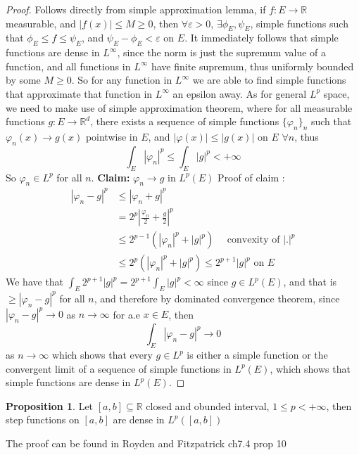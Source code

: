 \documentclass[13pt]{article}
\theoremstyle{definition} --- default
\newtheorem{proposition}[theorem]{Proposition}
\theoremstyle{definition}
\theoremstyle{remark}
\begin{document}
	\begin{proof}
		Follows directly from simple approximation lemma, if $f \colon E \to \mathbb{R}$ measurable, and $|f(x)| \leq M \geq 0$, then $\forall \varepsilon >0$, $\exists \phi_E, \psi_E$, simple functions such that $\phi_E \leq f \leq \psi_E$, and $\psi_E - \phi_E < \varepsilon$ on $E$. It immediately follows that simple functions are dense in $L^\infty$, since the norm is just the supremum value of a function, and all functions in $L^\infty$ have finite supremum, thus uniformly bounded by some $M \geq 0$. So for any function in $L^\infty$ we are able to find simple functions that approximate that function in $L^\infty$ an epsilon away. As for general $L^p$ space, we need to make use of simple approximation theorem, where for all measurable functions $g \colon E \to \mathbb{R}^d$, there exists a sequence of simple functions $\{\varphi_n\}_n$ such that $\varphi_n(x) \to g(x)$ pointwise in $E$, and $|\varphi(x)| \leq |g(x)|$ on $E$ $\forall n$, thus 
		$$ \int_{E} |\varphi_n|^p \leq \int_{E} |g|^p < +\infty$$
		So $\varphi_n \in L^p $ for all $n$. \textbf{Claim: } $\varphi_n \to g$ in $L^p (E)$
		Proof of claim : 
		\begin{align*}
			|\varphi_n - g|^p &\leq |\varphi_n + g|^p \\
					  &= 2^p |\frac{\varphi_n}{2} + \frac{g}{2}|^p \\
					  &\leq 2^{p-1} (|\varphi_n|^p + |g|^p )\quad \text{ convexity of $|.|^p$}\\
					  &\leq 2^p (|\varphi_n|^p  + |g|^p )\leq 2^{p+1}|g|^p \text{ on $E$}
		\end{align*}
		We have that $\int_{E} 2^{p+1}|g|^p  = 2^{p+1} \int_{E}|g|^p < \infty$ since $g \in L^p(E)$, and that is $\geq |\varphi_n -  g|^p $ for all $n$, and therefore by dominated convergence theorem, since $|\varphi_n - g|^p \to 0$ as $n \to \infty$ for a.e $x \in E$, then
		$$\int_{E} |\varphi_n - g|^p \to 0$$ as $n \to \infty$
		which shows that every $g \in L^p$ is either a simple function or the convergent limit of a sequence of simple functions in $L^p(E)$, which shows that simple functions are dense in $L^p(E)$. 

	\end{proof}
	\begin{proposition}
		Let $[a,b] \subseteq \mathbb{R}$ closed and obunded interval, $1\leq p < +\infty $, then step functions on $[a,b]$ are dense in $L^p([a,b])$
	\end{proposition}
	The proof can be found in Royden and Fitzpatrick ch7.4 prop 10
\end{document}
